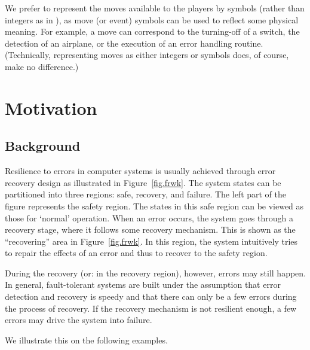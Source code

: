 We prefer to represent the moves available to the players by symbols (rather than integers as in \cite{AHK02}), as move (or event) symbols can be used to reflect some physical meaning.  
For example, a move can correspond to the turning-off of a switch,  
the detection of an airplane, 
or\label{reply1.grammar.or} the execution of an error handling routine.  
(Technically, representing moves as either integers or symbols 
does, of course, make no difference.)


\section{Motivation}
\subsection{Background}
Resilience to errors in computer systems is\label{reply2.are.is} usually 
achieved through error recovery design as illustrated in Figure~\ref{fig.frwk}.  
The system states can be partitioned into three regions: 
safe, recovery, and failure. 
The left part of the figure represents the safety region.
The states in this safe region can be viewed as those for `normal' operation. 
When an error occurs, the system goes through a recovery stage, where it follows some recovery mechanism.
This is shown as the ``recovering'' area in Figure~\ref{fig.frwk}.
In this region, the system intuitively tries to repair the effects of an error and thus to recover to the safety region. 

During the recovery (or: in the recovery region), however, errors may still happen.  
In general, fault-tolerant systems are built under the assumption that error detection and recovery is speedy and that there 
can only be a few errors\label{reply2.cannnot.be2} 
during the process of recovery.
If the recovery mechanism is not resilient enough, a few errors may drive the system into failure.  

We illustrate this on the following examples.  

